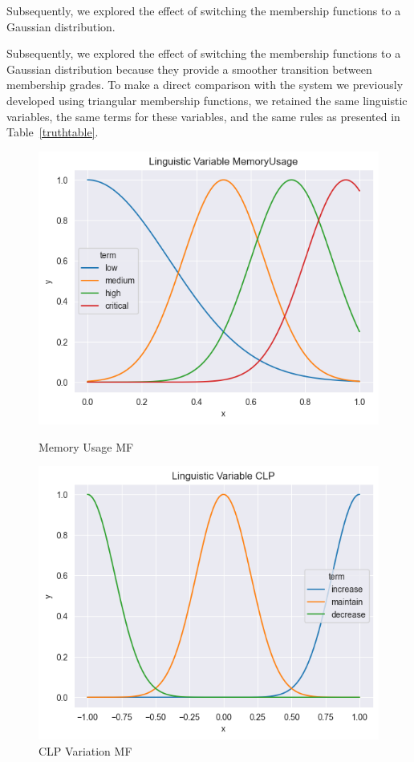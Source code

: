 \documentclass[11pt]{report}
\begin{document}
Subsequently, we explored the effect of switching the membership functions to a Gaussian distribution.


Subsequently, we explored the effect of switching the membership functions to a Gaussian distribution because they provide a smoother transition between membership grades.
To make a direct comparison with the system we previously developed using triangular membership functions, we retained the same linguistic variables, the same terms for these variables, and the same rules as presented in Table~\ref{truthtable}.

\begin{figure}[htbp]
    \centering
    \begin{minipage}{0.45\textwidth}
        \centering
        \includegraphics[width=\textwidth]{../images/guassian_MemoryUsage}
        \caption{Memory Usage MF}
        \label{fig:memory_usage_gaussian}
    \end{minipage}
    \hfill
    \begin{minipage}{0.45\textwidth}
        \centering
        \includegraphics[width=\textwidth]{../images/guassian_CLP}
        \caption{CLP Variation MF}
        \label{fig:clp_gaussian}
    \end{minipage}
\end{figure}
\end{document}
